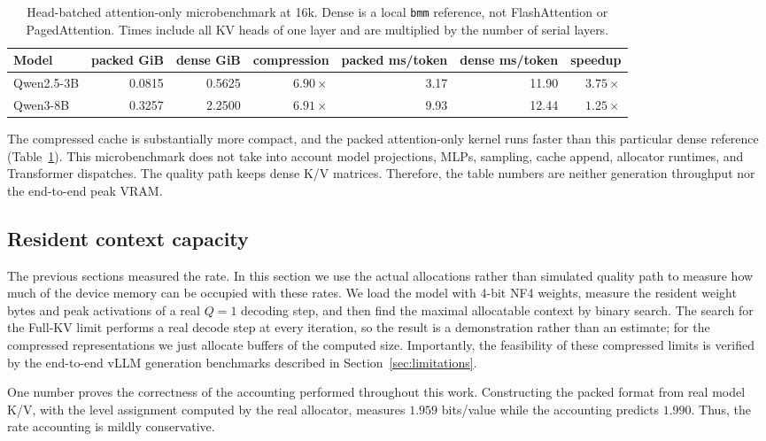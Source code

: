 \documentclass[10pt,twocolumn]{article}
\newcommand{\bpv}{bits/value}
\begin{document}
\begin{table}[t]
\centering\small
\caption{Head-batched attention-only microbenchmark at 16k. Dense is a local
\texttt{bmm} reference, not FlashAttention or PagedAttention. Times include
all KV heads of one layer and are multiplied by the number of serial layers.}
\label{tab:system}
\begin{tabular}{lrrrrrr}
\toprule
Model & packed GiB & dense GiB & compression & packed ms/token & dense ms/token & speedup \\
\midrule
Qwen2.5-3B & 0.0815 & 0.5625 & $6.90\times$ & 3.17 & 11.90 & $3.75\times$ \\
Qwen3-8B & 0.3257 & 2.2500 & $6.91\times$ & 9.93 & 12.44 & $1.25\times$ \\
\bottomrule
\end{tabular}
\end{table}

The compressed cache is substantially more compact, and the packed attention-only
kernel runs faster than this particular dense reference
(Table~\ref{tab:system}).
This microbenchmark does not take into account model projections, MLPs,
sampling, cache append, allocator runtimes, and Transformer dispatches. The
quality path keeps dense K/V matrices. Therefore, the table numbers are neither
generation throughput nor the end-to-end peak VRAM.

\subsection{Resident context capacity}
\label{sec:capacity}

The previous sections measured the rate. In this section we use the actual
allocations rather than simulated quality path to measure how much of the
device memory can be occupied with these rates. We load the model with
4-bit NF4 weights, measure the resident weight bytes and peak activations of
a real $Q=1$ decoding step, and then find the maximal allocatable context
by binary search. The search for the Full-KV limit performs a real decode
step at every iteration, so the result is a demonstration rather than an
estimate; for the compressed representations we just allocate buffers of the
computed size. Importantly, the feasibility of these compressed limits is verified
by the end-to-end vLLM generation benchmarks described in Section~\ref{sec:limitations}.

One number proves the correctness of the accounting performed throughout this work.
Constructing the packed format from real model K/V, with the level assignment
computed by the real allocator, measures $1.959$ \bpv{} while the accounting
predicts $1.990$. Thus, the rate accounting is mildly conservative.
\end{document}
